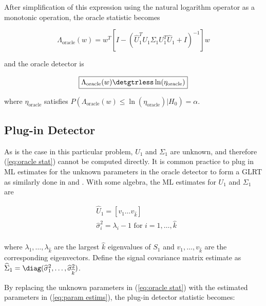 After simplification of this expression using the natural logarithm operator as a monotonic operation, the oracle statistic becomes

\begin{equation}\label{eq:oracle stat}
\boxed{\Lambda_{\text{oracle}}(w) = w^T\left[I-\left(\widehat{U}_1^TU_1\Sigma_1U_1^T\widehat{U}_1+I\right)^{-1}\right]w}
\end{equation}

and the oracle detector is

\begin{equation}\label{eq:oracle classifier}
\boxed{\Lambda_{\text{oracle}}(w) \detgtrless \ln(\eta_{\text{oracle}})}
\end{equation}

where $\eta_{\text{oracle}}$ satisfies $P(\Lambda_{\text{oracle}}(w)\leq\ln\left(\eta_{\text{oracle}}\right)|H_0)=\alpha$.

\subsection{Plug-in Detector}\label{sec:plugin}

As is the case in this particular problem, $U_1$ and $\Sigma_1$ are unknown, and therefore (\ref{eq:oracle stat}) cannot be computed directly. It is common practice to plug in ML estimates for the unknown parameters in the oracle detector to form a GLRT as similarly done in \cite{jin2005cfar} and \cite{mcwhorter2003matched}. With some algebra, the ML estimates for $U_1$ and $\Sigma_1$ are 

\begin{equation}\label{eq:param estims}
\begin{aligned}
&\widehat{U}_1=[v_1 \dots v_{\widehat{k}}]\\
&\widehat{\sigma}_i^2 = \lambda_i -1 \text{ for } i=1,\dots,\widehat{k}\\
\end{aligned}
\end{equation}

where $\lambda_1,\dots,\lambda_{\widehat{k}}$ are the largest $\widehat{k}$ eigenvalues of $S_1$ and $v_1,\dots,v_{\widehat{k}}$ are the corresponding eigenvectors. Define the signal covariance matrix estimate as $\widehat{\Sigma}_1=\diag(\widehat{\sigma}_1^2,\dots,\widehat{\sigma}_{\widehat{k}}^2)$.

By replacing the unknown parameters in (\ref{eq:oracle stat}) with the estimated parameters in (\ref{eq:param estims}), the plug-in detector statistic becomes:


